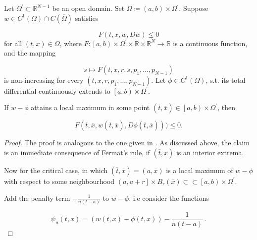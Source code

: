 \begin{lemma}
			\label{extension lemma}
			Let $ \Omega^{\prime} \subset \mathbb{R}^{N-1} $ be an open domain. Set $ \Omega \coloneqq \left( a, b \right) \times \Omega^{\prime} $. Suppose $ w \in C^{1}\left( \Omega \right) \cap C (\overline{\Omega})$ satisfies
			
			\begin{equation*}
				F(t, x, w, Dw) \leq 0
			\end{equation*}
			for all $ (t, x) \in \Omega $, where $ F : \left[ a, b \right) \times \Omega^{\prime} \times \mathbb{R} \times \mathbb{R}^{N} \to \mathbb{R} $ is a continuous function, and the mapping
			
			\begin{equation*}
				 s \mapsto F(t, x, r, s, p_1, \ldots, p_{N-1})
			\end{equation*}
			is non-increasing for every $ (t, x, r, p_1, \ldots, p_{N-1}) $. Let $ \phi \in C^{1} \left( \Omega \right) $, s.t. its total differential continuously extends to $ \left[a, b\right) \times \Omega^{\prime} $.
			
			If $ w - \phi $ attains a local maximum in some point $ (\overline{t}, \overline{x}) \in \left[a, b\right) \times \Omega^{\prime} $, then
			
			\begin{equation*}
				F(\overline{t}, \overline{x}, w(\overline{t}, \overline{x}), D\phi(\overline{t}, \overline{x}))) \leq 0.
			\end{equation*}
			
			\begin{proof}
				The proof is analogous to the one given in \cite[p.~41]{bardi2008optimal}. As discussed above, the claim is an immediate consequence of Fermat's rule, if $ (\overline{t}, \overline{x}) $ is an interior extrema.
				
				Now for the critical case, in which $ (\overline{t}, \overline{x}) = (a, \overline{x}) $ is a local maximum of $ w - \phi $ with respect to some neighbourhood $ \left( a, a + r \right] \times B_r(\overline{x}) \subset \subset \left[ a, b \right) \times \Omega^{\prime} $. 
				
				Add the penalty term $ - \frac{1}{n(t-a)} $ to $ w - \phi $, i.e consider the functions
				
				\begin{equation*}
					\psi_n(t, x) = ( w(t, x) - \phi(t, x)) - \frac{1}{n(t-a)} \ .
				\end{equation*}
				

\end{proof}
\end{lemma}
